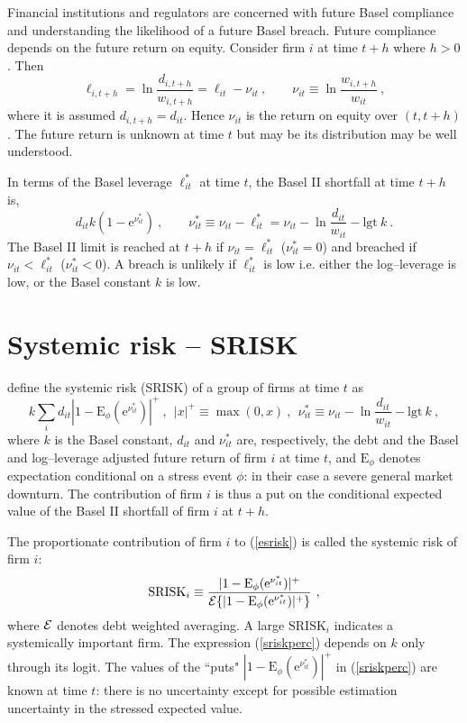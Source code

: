 \documentclass[authoryear]{elsarticle}
\newcommand{\logit}{\mathrm{lgt}}
\newcommand{\E}{\mathrm{E}}
\newcommand{\e}{\mathrm{e}}
\newcommand{\Ex}{{\cal E}}
\newcommand{\eref}[1]{(\ref{#1})}
\newcommand{\cq}{\ , \qquad}
\newcommand{\be}[1]{\begin{equation}\label{#1}}
\newcommand{\ee}{\end{equation}}
\begin{document}
Financial institutions and regulators are concerned with future Basel compliance and understanding  the likelihood of a  future Basel breach.   Future compliance depends on the future return on equity.   Consider  firm $i$ at time  $t+h$ where $h>0$.  Then
$$
\ell_{i,t+h} = \ln \frac{d_{i,t+h}}{w_{i,t+h}} = \ell_{it} -\nu_{it}\cq \nu_{it}\equiv \ln\frac{w_{i,t+h}}{w_{it}}  \ ,
$$
where it is assumed $d_{i,t+h}=d_{it}$.  Hence $\nu_{it}$ is the return on equity over $(t,t+h)$.  The future return is unknown at time $t$ but may be its distribution may be  well understood.

In terms of the Basel leverage $\ell_{it}^*$ at time $t$, the  Basel II shortfall  at time $t+h$ is,
\be{bs}
d_{it}k(1-\e^{\nu^*_{it}})\cq \nu_{it}^*\equiv \nu_{it}-\ell^*_{it}=\nu_{it}-\ln\frac{d_{it}}{w_{it}}-\logit\ k\ . 
\ee 
The Basel II limit is reached at $t+h$ if $\nu_{it}=\ell_{it}^*$ ($\nu_{it}^*=0$) and  breached  if
$
\nu_{it}< \ell_{it}^*
$ ($\nu_{it}^*<0$).
A breach is  unlikely if $\ell^*_{it}$ is low i.e. either the log--leverage is low, or the Basel constant $k$ is low.
\newcommand{\Es}{\E_\phi}





\section{Systemic risk -- SRISK}

\cite{brownlees2015} define the systemic risk (SRISK) of a group of firms  at time $t$ as
\be{esrisk}
k\sum_i d_{it}|1-\Es(\e^{\nu^*_{it}})|^+  \ ,\ \ |x|^+\equiv \max(0,x)\ ,\ \  \nu_{it}^*\equiv \nu_{it}-\ln\frac{d_{it}}{w_{it}}-\logit\ k\ ,
\ee
where $k$ is the Basel constant, $d_{it}$  and $\nu^*_{it}$ are, respectively,  the debt and the Basel and log--leverage adjusted future return  of firm $i$ at time $t$,  and $\Es$ denotes  expectation conditional on a stress event $\phi$:  in their case a severe general market downturn.
The contribution of firm $i$ is thus a put on the conditional expected value of the Basel II shortfall of firm $i$ at $t+h$.

 The proportionate contribution of firm $i$  to \eref{esrisk} is called the systemic risk of firm $i$:
 \be{sriskperc}
 \mathrm{SRISK}_i\equiv\frac{|1-\Es(\e^{\nu^*_{it}})|^+}{\Ex\{|1-\Es(\e^{\nu^*_{it}})|^+\}}\ , 
 \ee
where $\Ex$ denotes  debt weighted averaging.     A large $\mathrm{SRISK}_i$ indicates a systemically important firm.  The  expression \eref{sriskperc} depends on $k$ only through its logit.  The values of the ``puts" $|1-\Es(\e^{\nu^*_{it}})|^+$  in \eref{sriskperc} are known at time $t$:  there is no uncertainty except for possible estimation uncertainty in the stressed expected value.
\end{document}
